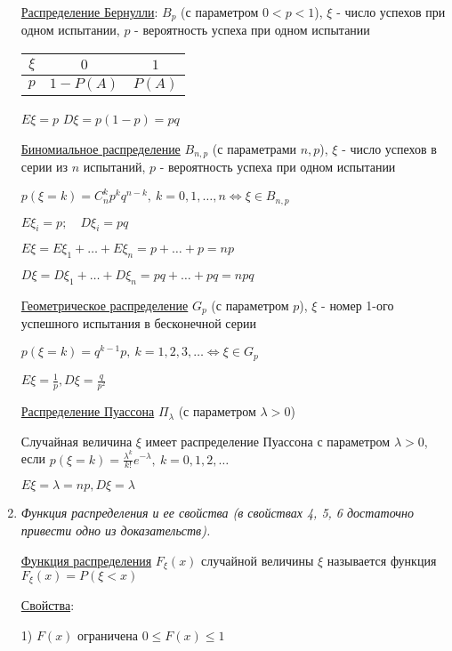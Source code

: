 \begin{enumerate}
    \hyperlink{bernoullidistribution}{Распределение Бернулли}: $B_p$ (с параметром $0 < p < 1$), $\xi$ - число успехов при одном испытании, $p$ - вероятность успеха при одном испытании

    \begin{tabular}{c|c|c}
        $\xi$ & $0$        & $1$    \\
        \hline
        $p$   & $1 - P(A)$ & $P(A)$
    \end{tabular} \qquad\qquad $E\xi = p$ \qquad\qquad $D\xi = p(1 - p) = pq$

    \hyperlink{binomialdistributionproperties}{Биномиальное распределение} $B_{n,p}$ (с параметрами $n, p$),
    $\xi$ - число успехов в серии из $n$ испытаний, $p$ - вероятность успеха при одном испытании

    $p(\xi = k) = C^k_n p^k q^{n - k}, \ k = 0, 1, \dots, n \Longleftrightarrow \xi \in B_{n,p}$

    $E\xi_i = p; \quad D\xi_i = pq$

    $E\xi = E\xi_1 + \dots + E\xi_n = p + \dots + p = np$

    $D\xi = D\xi_1 + \dots + D\xi_n = pq + \dots + pq = npq$

    \hyperlink{geometricdistributionproperties}{Геометрическое распределение} $G_p$ (с параметром $p$),
    $\xi$ - номер 1-ого успешного испытания в бесконечной серии

    $p(\xi = k) = q^{k - 1}p, \ k = 1, 2, 3, \dots \Longleftrightarrow \xi \in G_p$

    $E\xi = \frac{1}{p}, D\xi  = \frac{q}{p^2}$

    \hyperlink{poissondistribution}{Распределение Пуассона} $\Pi_\lambda$ (с параметром $\lambda > 0$)

    Случайная величина $\xi$ имеет распределение Пуассона с параметром $\lambda > 0$, если $p(\xi = k) = \frac{\lambda^k}{k!}e^{-\lambda}, \ k = 0, 1, 2, \dots$

    $E\xi = \lambda = np, D\xi = \lambda$


    \item \textit{Функция распределения и ее свойства (в свойствах 4, 5, 6 достаточно привести одно из доказательств).}
    
    \hyperlink{distributionfunction}{Функция распределения} $F_\xi(x)$ случайной величины $\xi$ называется функция $F_\xi(x) = P(\xi < x)$

    \hyperlink{distributionfunctionproperties}{Свойства}: 

    1) $F(x)$ ограничена $0 \leq F(x) \leq 1$


\end{enumerate}
